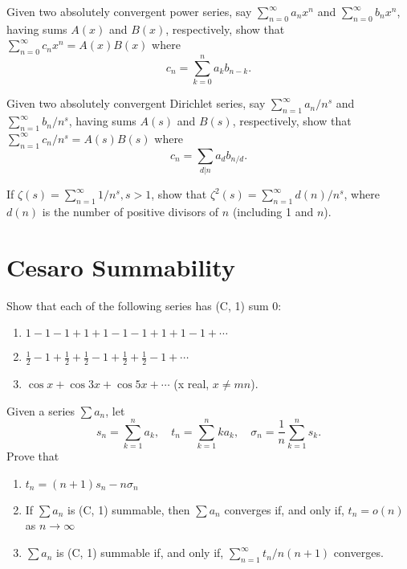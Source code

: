 \begin{problembox}
Given two absolutely convergent power series, say \(\sum_{n=0}^{\infty} a_n x^n\) and \(\sum_{n=0}^{\infty} b_n x^n\), having sums \(A(x)\) and \(B(x)\), respectively, show that \(\sum_{n=0}^{\infty} c_n x^n = A(x) B(x)\) where
\[c_n = \sum_{k=0}^{n} a_k b_{n-k}.\]
\end{problembox}



\begin{problembox}
Given two absolutely convergent Dirichlet series, say \(\sum_{n=1}^{\infty} a_n / n^s\) and \(\sum_{n=1}^{\infty} b_n / n^s\), having sums \(A(s)\) and \(B(s)\), respectively, show that \(\sum_{n=1}^{\infty} c_n / n^s = A(s) B(s)\) where
\[c_n = \sum_{d|n} a_d b_{n/d}.\]
\end{problembox}



\begin{problembox}
If \(\zeta(s) = \sum_{n=1}^{\infty} 1/n^s, s > 1\), show that \(\zeta^2(s) = \sum_{n=1}^{\infty} d(n) / n^s\), where \(d(n)\) is the number of positive divisors of \(n\) (including 1 and \(n\)).
\end{problembox}

\section{Cesaro Summability}



\begin{problembox}
Show that each of the following series has (C, 1) sum 0:
\begin{enumerate}[label=\alph*)]
\item \(1 - 1 - 1 + 1 + 1 - 1 - 1 + 1 + 1 - 1 + \cdots\)
\item \(\frac{1}{2} - 1 + \frac{1}{2} + \frac{1}{2} - 1 + \frac{1}{2} + \frac{1}{2} - 1 + \cdots\)
\item \(\cos x + \cos 3x + \cos 5x + \cdots\) (x real, \(x \neq mn\)).
\end{enumerate}
\end{problembox}



\begin{problembox}
Given a series \(\sum a_n\), let
\[s_n = \sum_{k=1}^{n} a_k, \quad t_n = \sum_{k=1}^{n} k a_k, \quad \sigma_n = \frac{1}{n} \sum_{k=1}^{n} s_k.\]
Prove that
\begin{enumerate}[label=\alph*)]
\item \(t_n = (n + 1)s_n - n\sigma_n\)
\item If \(\sum a_n\) is (C, 1) summable, then \(\sum a_n\) converges if, and only if, \(t_n = o(n)\) as \(n \to \infty\)
\item \(\sum a_n\) is (C, 1) summable if, and only if, \(\sum_{n=1}^{\infty} t_n / n(n + 1)\) converges.
\end{enumerate}
\end{problembox}



